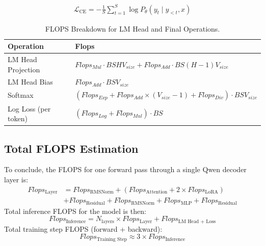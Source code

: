 \documentclass{article}
\begin{document}
\begin{align}
\mathcal{L}_{\text{CE}} = -\frac{1}{S} \sum_{t=1}^{S} \log P_\theta(y_t \mid y_{<t}, x)
\label{eq:ce_loss}
\end{align}


\begin{table}[!thbp]
\renewcommand{\arraystretch}{1.4} \centering \setlength{\tabcolsep}{8pt}
\begin{tabular}{@{}ll@{}} %
    \toprule \textbf{Operation} & \textbf{Flops} \\ \midrule
    LM Head Projection & $Flops_{Mul} \cdot BSH V_{size} + Flops_{Add} \cdot BS(H - 1) V_{size}$ \\
    LM Head Bias & $Flops_{Add} \cdot BS V_{size}$ \\ %
    Softmax & $(Flops_{Exp} + Flops_{Add} \times (V_{size}-1) + Flops_{Div}) \cdot BS V_{size}$ \\ %
    Log Loss (per token) & $(Flops_{Log} + Flops_{Mul}) \cdot BS$ \\ %
    \bottomrule
\end{tabular}
\caption{FLOPS Breakdown for LM Head and Final Operations.} \label{tab:lm_head_flops}
\end{table}

\subsection{Total FLOPS Estimation}

To conclude, the FLOPS for one forward pass through a single Qwen decoder layer is:
\begin{align}
Flops_{\text{Layer}} &= Flops_{\text{RMSNorm}} + (Flops_{\text{Attention}} + 2 \times Flops_{\text{LoRA}}) \nonumber \\
                     &+ Flops_{\text{Residual}} + Flops_{\text{RMSNorm}} + Flops_{\text{MLP}} + Flops_{\text{Residual}} \label{eq:qwen_layer_flops}
\end{align}
Total inference FLOPS for the model is then:
\begin{equation}
Flops_{\text{Inference}} = N_{\text{layers}} \times Flops_{\text{Layer}} + Flops_{\text{LM Head + Loss}}
\label{eq:qwen_inference_flops_revised}
\end{equation}
Total training step FLOPS (forward + backward):
\begin{equation}
Flops_{\text{Training Step}} \approx 3 \times Flops_{\text{Inference}}
\label{eq:qwen_training_flops_revised}
\end{equation}
\end{document}
